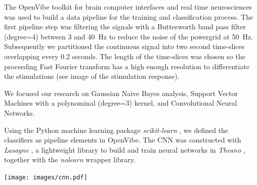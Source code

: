 \documentclass[landscape,final,a1paper,fontscale=0.4]{../baposter/baposter}
\begin{document}
\begin{poster}
{ The OpenVibe \cite{quelle1} toolkit for brain computer interfaces and real time neurosciences was used to build a data pipeline for the training and classification process. The first pipeline step was filtering the signals with a Butterworth band pass filter (degree=4) between 3 and 40~Hz to reduce the noise of the powergrid at 50~Hz. Subsequently we partitioned the continuous signal into two second time-slices overlapping every 0.2 seconds. The length of the time-slices was chosen so the proceeding Fast Fourier transform has a high enough resolution to differentiate the stimulations (see image of the stimulation response).

 We focused our research on Gaussian Naive Bayes analysis, Support Vector Machines with a polynominal (degree=3) kernel, and Convolutional Neural Networks.
 
Using the Python machine learning package \emph{scikit-learn} \cite{quelle2}, we defined the classifiers as pipeline elements in OpenVibe. The CNN was constructed with \emph{Lasagne}  \cite{quelle3}, a lightweight library to build and train neural networks in \emph{Theano} \cite{quelle4}, together with the \emph{nolearn} \cite{quelle5} wrapper library.

\begin{center}
	\texttt{[image: images/cnn.pdf]}
\end{center}

  }
  

  

\end{poster}
\end{document}
